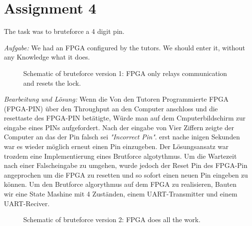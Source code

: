 \section*{Assignment 4}
The task was to bruteforce a 4 digit pin.

\emph{Aufgabe: }We had an FPGA configured by the tutors. We should enter it, without any Knowledge what it does.

\begin{figure}
    \begin{center}
        
        \caption{Schematic of bruteforce version 1: FPGA only relays communication and resets the lock.}
    \end{center}
\end{figure}

\emph{Bearbeitung und Lösung: }Wenn die Von den Tutoren Programmierte FPGA (FPGA-PIN) über den Throughput an den Computer anschloss und die resettaste des FPGA-PIN betätigte, Würde man auf dem Cmputerbildschirm zur eingabe eines PINs aufgefordert. Nach der eingabe von Vier Ziffern zeigte der Computer an das der Pin falsch sei \emph{"Incorrect Pin"}. erst nache inigen Sekunden war es wieder möglich erneut einen Pin einzugeben. 
Der Lösungsansatz war trozdem eine Implementierung eines Brutforce algotythmus. Um die Wartezeit nach einer Falscheingabe zu umgehen, wurde jedoch der Reset Pin des FPGA-Pin angeprochen um die FPGA zu resetten und so sofort einen neuen Pin eingeben zu können. 
Um den Brutforce algorythmus auf dem FPGA zu realisieren, Bauten wir eine State Mashine mit 4 Zuständen, einem UART-Transmitter und einem UART-Reciver.

\begin{figure}
    \begin{center}
        
        \caption{Schematic of bruteforce version 2: FPGA does all the work.}
    \end{center}
\end{figure}


